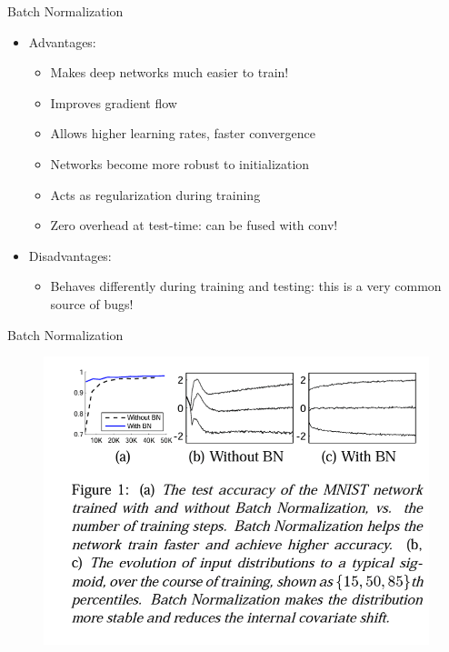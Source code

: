 \begin{frame}{Batch Normalization}
\begin{itemize}
    \item Advantages:
    \begin{itemize}
        \item Makes deep networks much easier to train!
        \item Improves gradient flow
        \item Allows higher learning rates, faster convergence
        \item Networks become more robust to initialization
        \item Acts as regularization during training
        \item Zero overhead at test-time: can be fused with conv!
    \end{itemize}
    \pause
    \item Disadvantages:
    \begin{itemize}
        \item Behaves differently during training and testing: this is a very common source of bugs!
    \end{itemize}
\end{itemize}
\end{frame}

\begin{frame}{Batch Normalization}
\begin{figure}
\centering
\includegraphics[width=1.0\textwidth,height=0.9\textheight,keepaspectratio]{images/batch_norm_6.png}
\end{figure}
\end{frame} 
